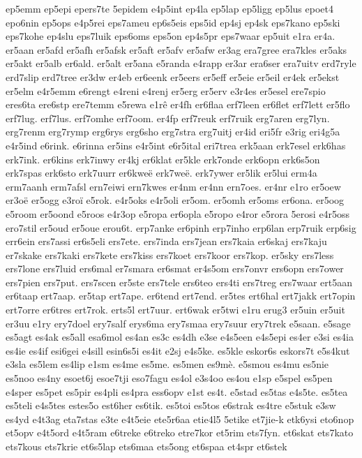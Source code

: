 ep5emm
ep5epi
epers7te
5epidem
e4p5int
ep4la
ep5lap
ep5ligg
ep5lus
epoet4
epo6nin
ep5ops
e4p5rei
eps7ameu
ep6s5eis
eps5id
ep4sj
ep4sk
eps7kano
ep5ski
eps7kohe
ep4slu
eps7luik
eps6oms
eps5on
ep4s5pr
eps7waar
ep5uit
e1ra
er4a.
er5aan
er5afd
er5afh
er5afsk
er5aft
er5afv
er5afw
er3ag
era7gree
era7kles
er5aks
er5akt
er5alb
er6ald.
er5alt
er5ana
e5randa
e4rapp
er3ar
era6ser
era7uitv
erd7ryle
erd7slip
erd7tree
er3dw
er4eb
er6eenk
er5eers
er5eff
er5eie
er5eil
er4ek
er5ekst
er5elm
e4r5emm
e6rengt
e4reni
e4renj
er5erg
er5erv
e3r4es
er5esel
ere7spio
eres6ta
ere6stp
ere7temm
e5rewa
e1rê
er4fh
er6flaa
erf7leen
er6flet
erf7lett
er5flo
erf7lug.
erf7lus.
erf7omhe
erf7oom.
er4fp
erf7reuk
erf7ruik
erg7aren
erg7lyn.
erg7renm
erg7rymp
erg6rys
erg6sho
erg7stra
erg7uitj
er4id
eri5fr
e3rig
eri4g5a
e4r5ind
e6rink.
e6rinna
er5ins
e4r5int
e6r5ital
eri7trea
erk5aan
erk7esel
erk6has
erk7ink.
er6kins
erk7inwy
er4kj
er6klat
er5kle
erk7onde
erk6opn
erk6s5on
erk7spas
erk6sto
erk7uurr
er6kweë
erk7weë.
erk7ywer
er5lik
er5lui
erm4a
erm7aanh
erm7afsl
ern7eiwi
ern7kwes
er4nm
er4nn
ern7oes.
er4nr
e1ro
er5oew
er3oë
er5ogg
e3roï
e5rok.
e4r5oks
e4r5oli
er5om.
er5omh
er5oms
er6ona.
er5oog
e5room
er5oond
e5roos
e4r3op
e5ropa
er6opla
e5ropo
e4ror
e5rora
5erosi
e4r5oss
ero7stil
er5oud
er5oue
erou6t.
erp7anke
er6pinh
erp7inho
erp6lan
erp7ruik
erp6sig
err6ein
ers7assi
er6s5eli
ers7ete.
ers7inda
ers7jean
ers7kaia
er6skaj
ers7kaju
er7skake
ers7kaki
ers7kete
ers7kiss
ers7koet
ers7koor
ers7kop.
er5sky
ers7less
ers7lone
ers7luid
ers6mal
er7smara
er6smat
er4s5om
ers7onvr
ers6opn
ers7ower
ers7pien
ers7put.
ers7scen
er5ste
ers7tele
ers6teo
ers4ti
ers7treg
ers7waar
ert5aan
er6taap
ert7aap.
er5tap
ert7ape.
er6tend
ert7end.
er5tes
ert6hal
ert7jakk
ert7opin
ert7orre
er6tres
ert7rok.
erts5l
ert7uur.
ert6wak
er5twi
e1ru
erug3
er5uin
er5uit
er3uu
e1ry
ery7doel
ery7salf
erys6ma
ery7smaa
ery7suur
ery7trek
e5saan.
e5sage
es5agt
es4ak
es5all
esa6mol
es4an
es3c
es4dh
e3se
e4s5een
e4s5epi
es4er
e3si
es4ia
es4ie
es4if
esi6gei
e4sill
esin6s5i
es4it
e2sj
e4s5ke.
es5kle
eskor6s
eskors7t
e5s4kut
e3sla
es5lem
es4lip
e1sm
es4me
es5me.
es5men
es9mè.
e5smou
es4mu
es5nie
es5noo
es4ny
esoet6j
esoe7tji
eso7fagu
es4ol
e3s4oo
es4ou
e1sp
e5spel
es5pen
e4sper
es5pet
es5pir
es4pli
es4pra
ess6opv
e1st
es4t.
e5stad
es5tas
e4s5te.
es5tea
es5teli
e4s5tes
estes5o
est6her
es6tik.
es5toi
es5tos
e6strak
es4tre
e5stuk
e3sw
es4yd
e4t3ag
eta7stas
e3te
e4t5eie
ete5r6aa
etie4l5
5etike
et7jie-k
etk6ysi
eto6nop
et5opv
e4t5ord
e4t5ram
e6treke
e6treko
etre7kor
et5rim
ets7fyn.
et6skat
ets7kato
ets7kous
ets7krie
et6s5lap
ets6maa
ets5ong
et6spaa
et4spr
et6stek
